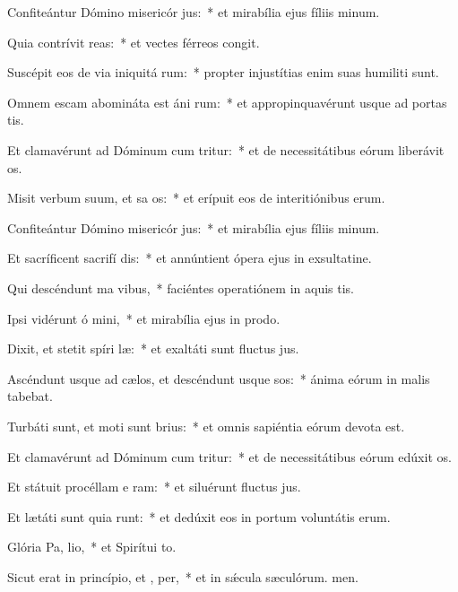 \item Confiteántur Dómino misericór jus:~* et mirabília ejus fíliis minum.
\item Quia contrívit  reas:~* et vectes férreos congit.
\item Suscépit eos de via iniquitá rum:~* propter injustítias enim suas humiliti sunt.
\item Omnem escam abomináta est áni rum:~* et appropinquavérunt usque ad portas tis.
\item Et clamavérunt ad Dóminum cum tritur:~* et de necessitátibus eórum liberávit os.
\item Misit verbum suum, et sa os:~* et erípuit eos de interitiónibus erum.
\item Confiteántur Dómino misericór jus:~* et mirabília ejus fíliis minum.
\item Et sacríficent sacrifí dis:~* et annúntient ópera ejus in exsultatine.
\item Qui descéndunt ma  vibus,~* faciéntes operatiónem in aquis tis.
\item Ipsi vidérunt ó mini,~* et mirabília ejus in prodo.
\item Dixit, et stetit spíri læ:~* et exaltáti sunt fluctus jus.
\item Ascéndunt usque ad cælos, et descéndunt usque  sos:~* ánima eórum in malis tabebat.
\item Turbáti sunt, et moti sunt  brius:~* et omnis sapiéntia eórum devota est.
\item Et clamavérunt ad Dóminum cum tritur:~* et de necessitátibus eórum edúxit os.
\item Et státuit procéllam e  ram:~* et siluérunt fluctus jus.
\item Et lætáti sunt quia runt:~* et dedúxit eos in portum voluntátis erum.
\item Glória Pa,  lio,~* et Spirítui to.
\item Sicut erat in princípio, et ,  per,~* et in sǽcula sæculórum. men.
